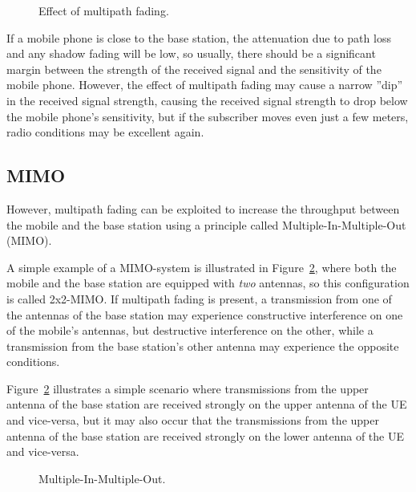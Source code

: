 \begin{figure}[htbp]
\centering
{}
\caption{\label{fig:rayleighfading}Effect of multipath fading.}
\end{figure}

If a mobile phone is close to the base station, the attenuation due to path loss and any shadow fading will be low, so usually, there should be a significant margin between the strength of the received signal and the sensitivity of the mobile phone. However, the effect of multipath fading may cause a narrow ''dip'' in the received signal strength, causing the received signal strength to drop below the mobile phone's sensitivity, but if the subscriber moves even just a few meters, radio conditions may be excellent again.

\subsection{MIMO}
However, multipath fading can be exploited to increase the throughput between the mobile and the base station using a principle called Multiple-In-Multiple-Out (MIMO).

A simple example of a MIMO-system is illustrated in Figure~\ref{fig:mimo}, where both the mobile and the base station are equipped with \emph{two} antennas, so this configuration is called 2x2-MIMO. If multipath fading is present, a transmission from one of the antennas of the base station may experience constructive interference on one of the mobile's antennas, but destructive interference on the other, while a transmission from the base station's other antenna may experience the opposite conditions.

Figure~\ref{fig:mimo} illustrates a simple scenario where transmissions from the upper antenna of the base station are received strongly on the upper antenna of the UE and vice-versa, but it may also occur that the transmissions from the upper antenna of the base station are received strongly on the lower antenna of the UE and vice-versa.

\begin{figure}[htbp]
\centering
\begin{subfigure}{\textwidth}
\centering
{}
\end{subfigure}\vspace{\baselineskip}
\begin{subfigure}{\textwidth}
\centering
{}
\end{subfigure}\vspace{\baselineskip}
\caption{\label{fig:mimo}Multiple-In-Multiple-Out.}
\end{figure}


